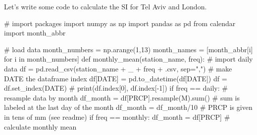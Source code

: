 \documentclass[
  letterpaper,
  DIV=11,
  numbers=noendperiod]{scrreprt}
\newenvironment{Shaded}{\begin{snugshade}}{\end{snugshade}}
\newcommand{\BuiltInTok}[1]{\textcolor[rgb]{0.00,0.23,0.31}{#1}}
\newcommand{\CommentTok}[1]{\textcolor[rgb]{0.37,0.37,0.37}{#1}}
\newcommand{\ControlFlowTok}[1]{\textcolor[rgb]{0.00,0.23,0.31}{#1}}
\newcommand{\DecValTok}[1]{\textcolor[rgb]{0.68,0.00,0.00}{#1}}
\newcommand{\ImportTok}[1]{\textcolor[rgb]{0.00,0.46,0.62}{#1}}
\newcommand{\KeywordTok}[1]{\textcolor[rgb]{0.00,0.23,0.31}{#1}}
\newcommand{\NormalTok}[1]{\textcolor[rgb]{0.00,0.23,0.31}{#1}}
\newcommand{\OperatorTok}[1]{\textcolor[rgb]{0.37,0.37,0.37}{#1}}
\newcommand{\StringTok}[1]{\textcolor[rgb]{0.13,0.47,0.30}{#1}}
\begin{document}
Let's write some code to calculate the SI for Tel Aviv and London.

\begin{Shaded}
\begin{Highlighting}[]
\CommentTok{\# import packages}
\ImportTok{import}\NormalTok{ numpy }\ImportTok{as}\NormalTok{ np}
\ImportTok{import}\NormalTok{ pandas }\ImportTok{as}\NormalTok{ pd}
\ImportTok{from}\NormalTok{ calendar }\ImportTok{import}\NormalTok{ month\_abbr}

\CommentTok{\# load data}
\NormalTok{month\_numbers }\OperatorTok{=}\NormalTok{ np.arange(}\DecValTok{1}\NormalTok{,}\DecValTok{13}\NormalTok{)}
\NormalTok{month\_names }\OperatorTok{=}\NormalTok{ [month\_abbr[i] }\ControlFlowTok{for}\NormalTok{ i }\KeywordTok{in}\NormalTok{ month\_numbers]}
\KeywordTok{def}\NormalTok{ monthly\_mean(station\_name, freq):}
    \CommentTok{\# import daily data}
\NormalTok{    df }\OperatorTok{=}\NormalTok{ pd.read\_csv(station\_name }\OperatorTok{+} \StringTok{\textquotesingle{}\_\textquotesingle{}} \OperatorTok{+}\NormalTok{ freq }\OperatorTok{+} \StringTok{\textquotesingle{}.csv\textquotesingle{}}\NormalTok{, sep}\OperatorTok{=}\StringTok{","}\NormalTok{)}
    \CommentTok{\# make \textquotesingle{}DATE\textquotesingle{} the dataframe index}
\NormalTok{    df[}\StringTok{\textquotesingle{}DATE\textquotesingle{}}\NormalTok{] }\OperatorTok{=}\NormalTok{ pd.to\_datetime(df[}\StringTok{\textquotesingle{}DATE\textquotesingle{}}\NormalTok{])}
\NormalTok{    df }\OperatorTok{=}\NormalTok{ df.set\_index(}\StringTok{\textquotesingle{}DATE\textquotesingle{}}\NormalTok{)}
    \CommentTok{\# print(df.index[0], df.index[{-}1])}
    \ControlFlowTok{if}\NormalTok{ freq }\OperatorTok{==} \StringTok{\textquotesingle{}daily\textquotesingle{}}\NormalTok{:}
        \CommentTok{\# resample data by month}
\NormalTok{        df\_month }\OperatorTok{=}\NormalTok{ df[}\StringTok{\textquotesingle{}PRCP\textquotesingle{}}\NormalTok{].resample(}\StringTok{\textquotesingle{}M\textquotesingle{}}\NormalTok{).}\BuiltInTok{sum}\NormalTok{()  }\CommentTok{\# sum is labeled at the last day of the month }
\NormalTok{        df\_month }\OperatorTok{=}\NormalTok{ df\_month}\OperatorTok{/}\DecValTok{10}                     \CommentTok{\# PRCP is given in tens of mm (see readme)}
    \ControlFlowTok{if}\NormalTok{ freq }\OperatorTok{==} \StringTok{\textquotesingle{}monthly\textquotesingle{}}\NormalTok{:}
\NormalTok{        df\_month }\OperatorTok{=}\NormalTok{ df[}\StringTok{\textquotesingle{}PRCP\textquotesingle{}}\NormalTok{]}
    \CommentTok{\# calculate monthly mean}

\end{Highlighting}
\end{Shaded}
\end{document}

